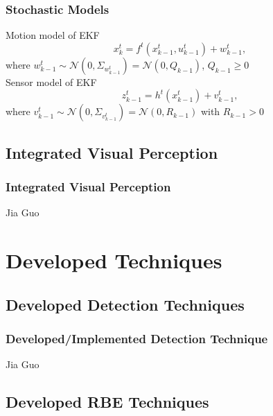 \documentclass{beamer}
\begin{document}

\begin{frame}
\frametitle{Stochastic Models}
Motion model of EKF 
\begin{equation}
x_k^t=f^t(x_{k-1}^t,u_{k-1}^t)+w_{k-1}^t,
\end{equation} 
where $w_{k-1}^t \sim \mathcal{N}(0, \Sigma_{w_{k-1}^t})=\mathcal{N}(0, 
Q_{k-1})$, $Q_{k-1} \geq 0$\\
\vspace{.2cm}
Sensor model of EKF 
\begin{equation}\label{obsM}
z_{k-1}^t=h^t(x_{k-1}^t)+v_{k-1}^t,
\end{equation} 
where $v_{k-1}^t \sim \mathcal{N}(0, \Sigma_{v_{k-1}^t})=\mathcal{N}(0, R_{k-1})$ with $R_{k-1}>0$
\end{frame}

\subsection{Integrated Visual Perception}

\begin{frame}
\frametitle{Integrated Visual Perception}
Jia Guo
\end{frame}

\section{Developed Techniques}
\subsection{Developed Detection Techniques}

\begin{frame}
\frametitle{Developed/Implemented Detection Technique}
Jia Guo
\end{frame}

\subsection{Developed RBE Techniques}
\end{document}
